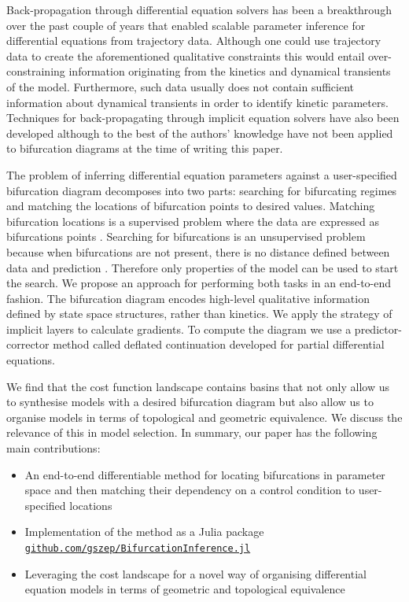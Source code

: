 \documentclass{article}
\begin{document}
Back-propagation through differential equation solvers has been a breakthrough over the past couple of years \cite{Chen2018NeuralEquations,Rackauckas2019DiffEqFlux.jlEquations} that enabled scalable parameter inference for differential equations from trajectory data. Although one could use trajectory data to create the aforementioned qualitative constraints \cite{Ranciati2017BayesianParameters,Khadivar2021LearningBifurcations} this would entail over-constraining information originating from the kinetics and dynamical transients of the model. Furthermore, such data usually does not contain sufficient information about dynamical transients in order to identify kinetic parameters. Techniques for back-propagating through implicit equation solvers have also been developed \cite{Look2020DifferentiableLayers,Bai2019DeepModels} although to the best of the authors' knowledge have not been applied to bifurcation diagrams at the time of writing this paper.

The problem of inferring differential equation parameters against a user-specified bifurcation diagram decomposes into two parts: searching for bifurcating regimes and matching the locations of bifurcation points to desired values. Matching bifurcation locations is a supervised problem where the data are expressed as bifurcations points \cite{Lu2006InverseSystems,Conrad2006BifurcationClock}. Searching for bifurcations is an unsupervised problem because when bifurcations are not present, there is no distance defined between data and prediction \cite{Chickarmane2005BifurcationTool}. Therefore only properties of the model can be used to start the search. We propose an approach for performing both tasks in an end-to-end fashion. The bifurcation diagram encodes high-level qualitative information defined by state space structures, rather than kinetics. We apply the strategy of implicit layers \cite{Look2020DifferentiableLayers,Bai2019DeepModels} to calculate gradients. To compute the diagram we use a predictor-corrector method called deflated continuation \cite{Farrell2016TheDiagrams,Veltz2020BifurcationKit.jl} developed for partial differential equations.

We find that the cost function landscape contains basins that not only allow us to synthesise models with a desired bifurcation diagram but also allow us to organise models in terms of topological and geometric equivalence. We discuss the relevance of this in model selection. In summary, our paper has the following main contributions:

\begin{itemize}
    \item An end-to-end differentiable method for locating bifurcations in parameter space and then matching their dependency on a control condition to user-specified locations
    \item Implementation of the method as a Julia package\\
\href{https://github.com/gszep/BifurcationInference.jl}{\texttt{github.com/gszep/BifurcationInference.jl}}
    \item Leveraging the cost landscape for a novel way of organising differential equation models in terms of geometric and topological equivalence
\end{itemize}
\end{document}
